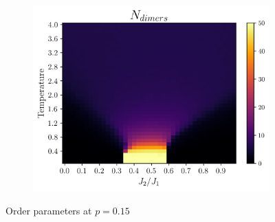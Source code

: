 \documentclass[../thesis_main.tex]{subfiles}
\begin{document}
\begin{figure}[!htb]
\begin{subfigure}[b]{0.43\textwidth}
        \centering
        \includegraphics[width=\textwidth]{images/j1-j2/phase_diagrams/p=0.15/N_dimers_p=0.15.png}
    \end{subfigure}
    \caption{Order parameters at $p = 0.15$}
    \label{p=0.15}
\end{figure}
\FloatBarrier
\end{document}
